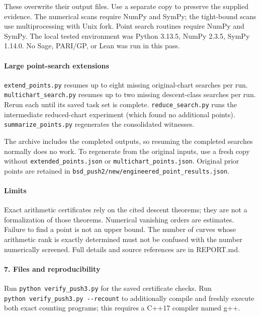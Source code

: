 \documentclass[11pt]{article}
\begin{document}
These overwrite their output files. Use a separate copy to preserve the supplied evidence. The numerical scans require NumPy and SymPy; the tight-bound scans use multiprocessing with Unix fork. Point search routines require NumPy and SymPy. The local tested environment was Python 3.13.5, NumPy 2.3.5, SymPy 1.14.0. No Sage, PARI/GP, or Lean was run in this pass.

\paragraph{Large point-search extensions}

\nolinkurl{extend_points.py} resumes up to eight missing original-chart searches per run. \nolinkurl{multichart_search.py} resumes up to two missing descent-class searches per run. Rerun each until its saved task set is complete. \nolinkurl{reduce_search.py} runs the intermediate reduced-chart experiment (which found no additional points). \nolinkurl{summarize_points.py} regenerates the consolidated witnesses.

The archive includes the completed outputs, so resuming the completed searches normally does no work. To regenerate from the original inputs, use a fresh copy without \nolinkurl{extended_points.json} or \nolinkurl{multichart_points.json}. Original prior points are retained in \nolinkurl{bsd_push2/new/engineered_point_results.json}.

\paragraph{Limits}

Exact arithmetic certificates rely on the cited descent theorems; they are not a formalization of those theorems. Numerical vanishing orders are estimates. Failure to find a point is not an upper bound. The number of curves whose arithmetic rank is exactly determined must not be confused with the number numerically screened. Full details and source references are in REPORT.md.
\paragraph{7. Files and reproducibility}

Run \texttt{python\ verify\_push3.py} for the saved certificate checks. Run \texttt{python\ verify\_push3.py\ -\/-recount} to additionally compile and freshly execute both exact counting programs; this requires a C++17 compiler named g++.
\end{document}
